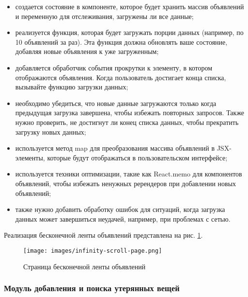 \begin{itemize}[wide=0pt]
	\item создается состояние в компоненте, которое будет хранить массив объявлений и переменную для отслеживания, загружены ли все данные;
	
	\item реализуется функция, которая будет загружать порции данных (например, по 10 объявлений за раз). Эта функция должна обновлять ваше состояние, добавляя новые объявления к уже загруженным;
	
	\item добавляется обработчик события прокрутки к элементу, в котором отображаются объявления. Когда пользователь достигает конца списка, вызывайте функцию загрузки данных;
	
	\item необходимо убедиться, что новые данные загружаются только когда предыдущая загрузка завершена, чтобы избежать повторных запросов. Также нужно проверить, не достигнут ли конец списка данных, чтобы прекратить загрузку новых данных;
	
	\item используется метод map для преобразования массива объявлений в JSX-элементы, которые будут отображаться в пользовательском интерфейсе;
	
	\item используется техники оптимизации, такие как React.memo для компонентов объявлений, чтобы избежать ненужных ререндеров при добавлении новых объявлений;
	
	\item также нужно добавить обработку ошибок для ситуаций, когда загрузка данных может завершиться неудачей, например, при проблемах с сетью.
\end{itemize}

Реализация бесконечной ленты объявлений представлена на рис. \ref{fig:infinity-scroll-page}.

\begin{figure}[htb]
	\centering
	\texttt{[image: images/infinity-scroll-page.png]}
	\parskip=6pt
	\caption{Страница бесконечной ленты объявлений}
	\label{fig:infinity-scroll-page}
\end{figure}

\subsubsection{Модуль добавления и поиска утерянных вещей}

